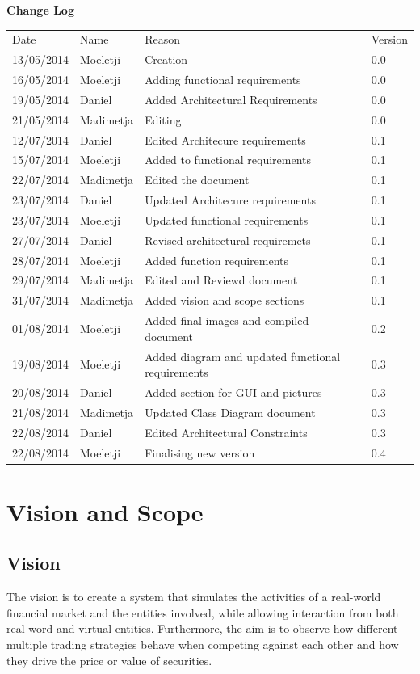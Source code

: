 \documentclass[12pt]{article}
\begin{document}
	\newpage		
	\large 
 	{\bf Change Log}\\[1em]
	\begin{tabular}{llll}
		Date & Name & Reason & Version \\
		13/05/2014 & Moeletji & Creation & 0.0 \\
		16/05/2014 & Moeletji & Adding functional requirements & 0.0 \\
		19/05/2014 & Daniel & Added Architectural Requirements & 0.0 \\
		21/05/2014 & Madimetja & Editing & 0.0 \\
		12/07/2014 & Daniel & Edited Architecure requirements & 0.1 \\
		15/07/2014 & Moeletji & Added to functional requirements & 0.1 \\
		22/07/2014 & Madimetja & Edited the document & 0.1 \\
		23/07/2014 & Daniel & Updated Architecure requirements & 0.1\\
		23/07/2014 & Moeletji & Updated functional requirements & 0.1\\
		27/07/2014 & Daniel & Revised architectural requiremets & 0.1\\
		28/07/2014 & Moeletji & Added function requirements & 0.1\\
		29/07/2014 & Madimetja & Edited and Reviewd document & 0.1\\
		31/07/2014 & Madimetja & Added vision and scope sections & 0.1\\
		01/08/2014 & Moeletji & Added final images and compiled document & 0.2\\
		19/08/2014 & Moeletji & Added diagram and updated functional requirements & 0.3\\
        20/08/2014 & Daniel & Added section for GUI and pictures & 0.3\\
        21/08/2014 & Madimetja &  Updated Class Diagram document & 0.3\\
        22/08/2014 & Daniel & Edited Architectural Constraints & 0.3\\
        22/08/2014 & Moeletji & Finalising new version & 0.4\\
	\end{tabular}
	
	\newpage
	\tableofcontents
				  
		\newpage
			\section{Vision and Scope}
				\subsection{Vision}
				The vision is to create a system that simulates the activities of a real-world financial market and the entities involved, while allowing interaction from both real-word and virtual entities. Furthermore, the aim is to observe how different multiple trading strategies behave when competing against each other and how they drive the price or value of securities.
				
\end{document}
